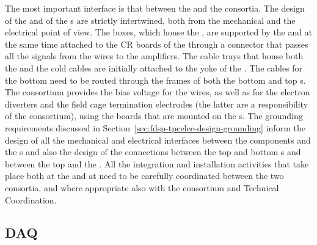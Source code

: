 The most important interface is that between the 
and the  consortia. The design of the 
and of the s are strictly intertwined, both from the
mechanical and the electrical point of view. The 
boxes, which house the , are supported by the 
and at the same time attached to the CR boards of the 
through a connector that passes all the signals from the wires to
the  amplifiers. The cable trays that house both the
 and the  cold cables are initially
attached to the yoke of the . The 
cables for the bottom  need to be routed through the 
frames of both the bottom and top s. The 
consortium provides the bias voltage for the 
wires, as well as for the electron diverters and the field
cage termination electrodes (the latter are a responsibility of
the  consortium), using the  boards that are mounted
on the s. The grounding requirements discussed in
Section~\ref{sec:fdsp-tpcelec-design-grounding} inform the
design of all the mechanical and electrical interfaces between
the  components and the s and also the
design of the connections between the top and bottom s
and between the top  and the . All the
integration and installation activities that take place both at
the  and at \surf need to be carefully coordinated between
the two consortia, and where appropriate also with the 
consortium and Technical Coordination.

\subsection{DAQ}
\label{sec:fdsp-tpcelec-interfaces-daq}

